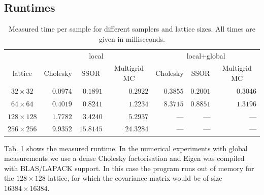 \documentclass[11pt]{article}
\begin{document}
\subsection{Runtimes}
\begin{table}
    \begin{center}
        \begin{tabular}{crrrrrr}
            \hline
            & \multicolumn{3}{c}{local} & \multicolumn{3}{c}{local+global}\\
            lattice         & \multicolumn{1}{c}{Cholesky} & \multicolumn{1}{c}{SSOR} & \multicolumn{1}{c}{Multigrid MC} & \multicolumn{1}{c}{Cholesky} & \multicolumn{1}{c}{SSOR} & \multicolumn{1}{c}{Multigrid MC} \\
            \hline\hline
            $32\times 32$   & $0.0974$                     & $0.1891$                 & $0.2922$ & $0.3855$ & $0.2001$ & $0.3046$                        \\
            $64\times 64$   & $0.4019$                     & $0.8241$                 & $1.2234$ & $8.3715$ & $0.8851$ & $1.3196$                         \\
            $128\times 128$ & $1.7782$                    & $3.4240$                 & $5.2937$ & --- & --- & ---                        \\
            $256\times 256$ & $9.9352$                   & $15.8145$                 & $24.3284$ & --- & --- & ---                       \\
            \hline
        \end{tabular}
        \caption{Measured time per sample for different samplers and lattice sizes. All times are given in milliseconds.}
        \label{tab:runtimes}
    \end{center}
\end{table}
Tab. \ref{tab:runtimes} shows the measured runtime. In the numerical experiments with global measurements we use a dense Cholesky factorisation and Eigen was compiled with BLAS/LAPACK support. In this case the program runs out of memory for the $128\times 128$ lattice, for which the covariance matrix would be of size $16384\times 16384$.
\end{document}
